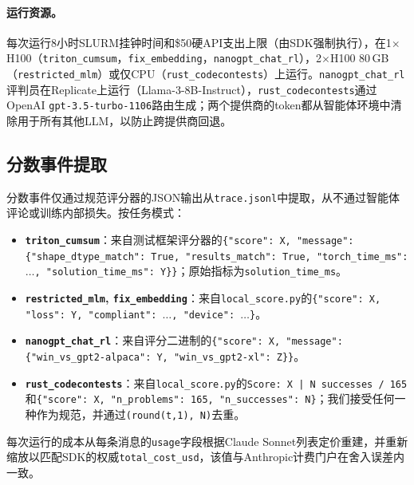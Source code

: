 \paragraph{运行资源。}每次运行8小时SLURM挂钟时间和\$50硬API支出上限（由SDK强制执行），在1$\times$H100（\texttt{triton\_cumsum}，\texttt{fix\_embedding}，\texttt{nanogpt\_chat\_rl}），2$\times$H100 80\,GB（\texttt{restricted\_mlm}）或仅CPU（\texttt{rust\_codecontests}）上运行。\texttt{nanogpt\_chat\_rl}评判员在Replicate上运行（Llama-3-8B-Instruct），\texttt{rust\_codecontests}通过OpenAI \texttt{gpt-3.5-turbo-1106}路由生成；两个提供商的token都从智能体环境中清除用于所有其他LLM，以防止跨提供商回退。

\subsection{分数事件提取}
\label{sec-extension-scoring}

分数事件仅通过规范评分器的JSON输出从\texttt{trace.jsonl}中提取，从不通过智能体评论或训练内部损失。按任务模式：

\begin{itemize}[leftmargin=*, itemsep=2pt, topsep=2pt]
  \item \textbf{\texttt{triton\_cumsum}}：来自测试框架评分器的\texttt{\{"score": X, "message": \{"shape\_dtype\_match": True, "results\_match": True, "torch\_time\_ms": $…$, "solution\_time\_ms": Y\}\}}；原始指标为\texttt{solution\_time\_ms}。
  \item \textbf{\texttt{restricted\_mlm}, \texttt{fix\_embedding}}：来自\texttt{local\_score.py}的\texttt{\{"score": X, "loss": Y, "compliant": $…$, "device": $…$\}}。
  \item \textbf{\texttt{nanogpt\_chat\_rl}}：来自评分二进制的\texttt{\{"score": X, "message": \{"win\_vs\_gpt2-alpaca": Y, "win\_vs\_gpt2-xl": Z\}\}}。
  \item \textbf{\texttt{rust\_codecontests}}：来自\texttt{local\_score.py}的\texttt{Score: X | N successes / 165}和\texttt{\{"score": X, "n\_problems": 165, "n\_successes": N\}}；我们接受任何一种作为规范，并通过\texttt{(round(t,1), N)}去重。
\end{itemize}

每次运行的成本从每条消息的\texttt{usage}字段根据Claude Sonnet列表定价重建，并重新缩放以匹配SDK的权威\texttt{total\_cost\_usd}，该值与Anthropic计费门户在舍入误差内一致。

